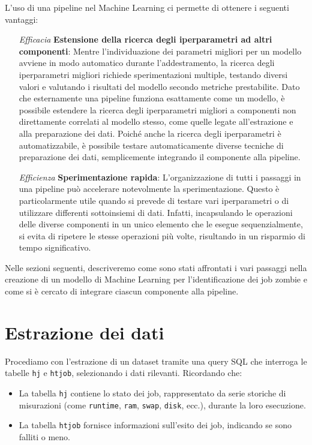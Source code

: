 L'uso di una pipeline nel Machine Learning ci permette di ottenere i seguenti
vantaggi:
\begin{itemize}
    \item[\textit{Efficacia}] \textbf{Estensione della ricerca degli iperparametri ad altri
        componenti}: Mentre l'individuazione dei parametri migliori per un
        modello avviene in modo automatico durante l'addestramento, la ricerca
        degli iperparametri migliori richiede sperimentazioni multiple,
        testando diversi valori e valutando i risultati del modello secondo
        metriche prestabilite. Dato che esternamente una pipeline funziona
        esattamente come un modello, è possibile estendere la ricerca degli
        iperparametri migliori a componenti non direttamente correlati al
        modello stesso, come quelle legate all'estrazione e alla preparazione
        dei dati. Poiché anche la ricerca degli iperparametri è
        automatizzabile, è possibile testare automaticamente diverse tecniche
        di preparazione dei dati, semplicemente integrando il componente alla
        pipeline.
    \item [\textit{Efficienza}]\textbf{Sperimentazione rapida}: L'organizzazione di tutti i
        passaggi in una pipeline può accelerare notevolmente la
        sperimentazione. Questo è particolarmente utile quando si prevede di
        testare vari iperparametri o di utilizzare differenti sottoinsiemi di
        dati. Infatti, incapsulando le operazioni delle diverse componenti in
        un unico elemento che le esegue sequenzialmente, si evita di ripetere
        le stesse operazioni più volte, risultando in un risparmio di tempo
        significativo.
\end{itemize}

Nelle sezioni seguenti, descriveremo come sono stati affrontati i vari
passaggi nella creazione di un modello di Machine Learning per
l'identificazione dei job zombie e come si è cercato di integrare ciascun
componente alla pipeline.

\section{Estrazione dei dati}

Procediamo con l'estrazione di un dataset tramite una query SQL che interroga
le tabelle \texttt{hj} e \texttt{htjob}, selezionando i dati rilevanti.
Ricordando che:
\begin{itemize}
    \item La tabella \texttt{hj} contiene lo stato dei job, rappresentato da
        serie storiche di misurazioni (come \texttt{runtime}, \texttt{ram},
        \texttt{swap}, \texttt{disk}, ecc.),
        durante la loro esecuzione.
    \item La tabella \texttt{htjob} fornisce informazioni sull'esito dei job,
        indicando se sono falliti o meno.
\end{itemize}

